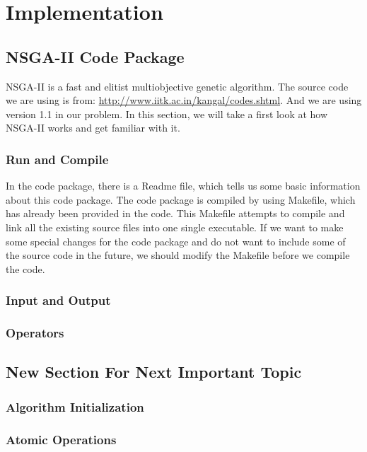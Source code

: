 \chapter{Implementation}
\label{chap:impl}

\section{NSGA-II Code Package}
NSGA-II is a fast and elitist multiobjective genetic algorithm. The source code we are using is from: \url{http://www.iitk.ac.in/kangal/codes.shtml}. And we are using version 1.1 in our problem. In this section, we will take a first look at how NSGA-II works and get familiar with it.

\subsection{Run and Compile} %
In the code package, there is a Readme file, which tells us some basic information about this code package. The code package is compiled by using Makefile, which has already been provided in the code. This Makefile attempts to compile and link all the existing source files into one single executable. If we want to make some special changes for the code package and do not want to include some of the source code in the future, we should modify the Makefile before we compile the code.

\subsection{Input and Output} %

\subsection{Operators} %

\section{New Section For Next Important Topic}

\subsection{Algorithm Initialization}
\subsection{Atomic Operations}

